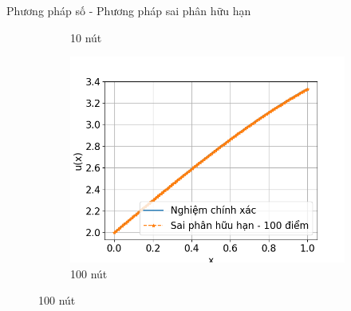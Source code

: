 \documentclass[aspectratio=169, t]{beamer} %
\begin{document}
\begin{frame}{Phương pháp số - Phương pháp sai phân hữu hạn}
\begin{figure}[htbp]
\begin{subfigure}[b]{0.3\linewidth}
        \caption{10 nút}
        \label{fig:SPHH_10p}
    \end{subfigure}\hfill
    \begin{subfigure}[b]{0.3\linewidth}
        \centering
        \includegraphics[width=\linewidth]{Slides/Figure/SPHH_100p.png}
        \caption{100 nút}
        \label{fig:SPHH_100p}
    \end{subfigure}
    \label{fig_SPHHresults}
\end{figure}
\end{frame}
\end{document}
